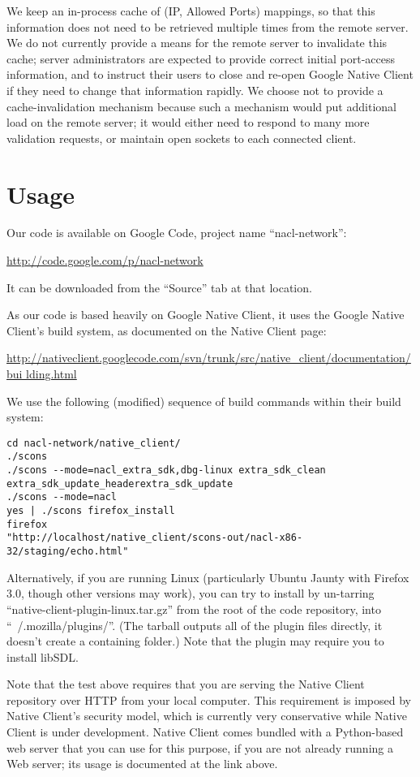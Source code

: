 \documentclass[a4paper,10pt]{article}
\begin{document}
We keep an in-process cache of (IP, Allowed Ports) mappings, so that this
information does not need to be retrieved multiple times from the remote
server.  We do not currently provide a means for the remote server to
invalidate this cache; server administrators are expected to provide correct
initial port-access information, and to instruct their users to close and
re-open Google Native Client if they need to change that information rapidly.
We choose not to provide a cache-invalidation mechanism because such a
mechanism would put additional load on the remote server; it would either need
to respond to many more validation requests, or maintain open sockets to each
connected client.

\section{Usage}

Our code is available on Google Code, project name ``nacl-network'':

\url{http://code.google.com/p/nacl-network}

It can be downloaded from the ``Source'' tab at that location.

As our code is based heavily on Google Native Client, it uses the Google Native
Client's build system, as documented on the Native Client page:

\url{
http://nativeclient.googlecode.com/svn/trunk/src/native_client/documentation/bui
lding.html}

We use the following (modified) sequence of build commands within their build
system:

\begin{verbatim}
cd nacl-network/native_client/
./scons
./scons --mode=nacl_extra_sdk,dbg-linux extra_sdk_clean
extra_sdk_update_headerextra_sdk_update
./scons --mode=nacl
yes | ./scons firefox_install
firefox
"http://localhost/native_client/scons-out/nacl-x86-32/staging/echo.html"
\end{verbatim}

Alternatively, if you are running Linux (particularly Ubuntu Jaunty with
Firefox 3.0, though other versions may work), you can try to install by
un-tarring ``native-client-plugin-linux.tar.gz'' from the root of the code
repository, into ``~/.mozilla/plugins/''.  (The tarball outputs all of the
plugin files directly, it doesn't create a containing folder.)  Note that the
plugin may require you to install libSDL.

Note that the test above requires that you are serving the Native Client
repository over HTTP from your local computer.  This requirement is imposed
by Native Client's security model, which is currently very conservative while
Native Client is under development. Native Client comes bundled with a
Python-based web server that you can use for this purpose, if you are not
already running a Web server; its usage is documented at the link above.
\end{document}
